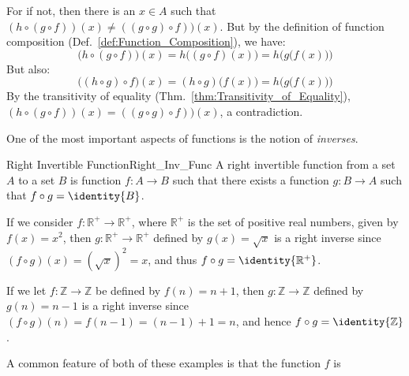         \begin{bproof}
            For if not, then there is an $x\in{A}$ such that
            $(h\circ(g\circ{f}))(x)\ne((g\circ{g})\circ{f}))(x)$. But by the
            definition of function composition
            (Def.~\ref{def:Function_Composition}), we have:
            \begin{equation}
                \big(h\circ(g\circ{f})\big)(x)
                =h\big((g\circ{f})(x)\big)
                =h\Big(g\big(f(x)\big)\Big)
            \end{equation}
            But also:
            \begin{equation}
                \big((h\circ{g})\circ{f}\big)(x)
                =(h\circ{g})\big(f(x)\big)
                =h\Big(g\big(f(x)\big)\Big)
            \end{equation}
            By the transitivity of equality 
            (Thm.~\ref{thm:Transitivity_of_Equality}),
            $(h\circ(g\circ{f}))(x)=((g\circ{g})\circ{f}))(x)$, a contradiction.
        \end{bproof}
        One of the most important aspects of functions is the notion of
        \textit{inverses}.
        \begin{fdefinition}{Right Invertible Function}{Right_Inv_Func}
            A right invertible function from a set $A$ to a set $B$ is function
            $f:A\rightarrow{B}$ such that there exists a function
            $g:B\rightarrow{A}$ such that $f\circ{g}=\identity{B}$.
        \end{fdefinition}
        \begin{example}
            If we consider $f:\mathbb{R}^{+}\rightarrow\mathbb{R}^{+}$, where
            $\mathbb{R}^{+}$ is the set of positive real numbers, given by
            $f(x)=x^{2}$, then $g:\mathbb{R}^{+}\rightarrow\mathbb{R}^{+}$
            defined by $g(x)=\sqrt{x}$ is a right inverse since
            $(f\circ{g})(x)=(\sqrt{x})^{2}=x$, and thus
            $f\circ{g}=\identity{\mathbb{R}^{+}}$.
        \end{example}
        \begin{example}
            If we let $f:\mathbb{Z}\rightarrow\mathbb{Z}$ be defined by
            $f(n)=n+1$, then $g:\mathbb{Z}\rightarrow\mathbb{Z}$ defined by
            $g(n)=n-1$ is a right inverse since
            $(f\circ{g})(n)=f(n-1)=(n-1)+1=n$, and hence
            $f\circ{g}=\identity{\mathbb{Z}}$.
        \end{example}
        A common feature of both of these examples is that the function $f$ is
